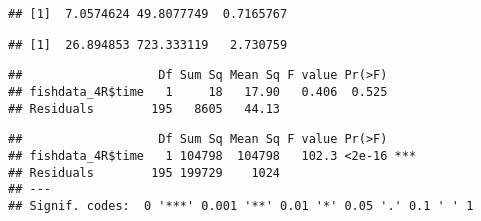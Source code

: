 \documentclass[
]{book}
\newenvironment{Shaded}{\begin{snugshade}}{\end{snugshade}}
\newcommand{\CommentTok}[1]{\textcolor[rgb]{0.56,0.35,0.01}{\textit{#1}}}
\newcommand{\FunctionTok}[1]{\textcolor[rgb]{0.00,0.00,0.00}{#1}}
\newcommand{\NormalTok}[1]{#1}
\newcommand{\SpecialCharTok}[1]{\textcolor[rgb]{0.00,0.00,0.00}{#1}}
\newcommand{\StringTok}[1]{\textcolor[rgb]{0.31,0.60,0.02}{#1}}
\begin{document}
\begin{verbatim}
## [1]  7.0574624 49.8077749  0.7165767
\end{verbatim}

\begin{Shaded}
\end{Shaded}

\begin{verbatim}
## [1]  26.894853 723.333119   2.730759
\end{verbatim}

\begin{Shaded}
\end{Shaded}

\begin{verbatim}
##                   Df Sum Sq Mean Sq F value Pr(>F)
## fishdata_4R$time   1     18   17.90   0.406  0.525
## Residuals        195   8605   44.13
\end{verbatim}

\begin{Shaded}
\end{Shaded}

\begin{verbatim}
##                   Df Sum Sq Mean Sq F value Pr(>F)    
## fishdata_4R$time   1 104798  104798   102.3 <2e-16 ***
## Residuals        195 199729    1024                   
## ---
## Signif. codes:  0 '***' 0.001 '**' 0.01 '*' 0.05 '.' 0.1 ' ' 1
\end{verbatim}
\end{document}
